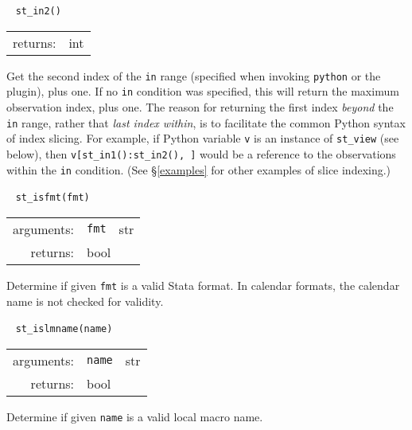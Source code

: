 \documentclass{article}
\begin{document}
			
			\ \newline
			\noindent \lstinline$st_in2()$
								
			\vspace{1.5mm}
			\noindent 
			\indent \begin{tabular}{rl}
					returns: & int
				\end{tabular}
								
			\vspace{1.5mm}
			\noindent Get the second index of the \texttt{in} range (specified when invoking \lstinline{python} or the plugin), plus one. If no \texttt{in} condition was specified, this will return the maximum observation index, plus one. The reason for returning the first index {\em beyond} the \texttt{in} range, rather that {\em last index within}, is to facilitate the common Python syntax of index slicing. For example, if Python variable \texttt{v} is an instance of \lstinline{st_view} (see below), then \lstinline$v[st_in1():st_in2(), ]$ would be a reference to the observations within the \texttt{in} condition. (See \S\ref{examples} for other examples of slice indexing.) \newline
			
			
			\ \newline
			\noindent \lstinline$st_isfmt(fmt)$
								
			\vspace{1.5mm}
			\noindent 
			\indent \begin{tabular}{rrl}
					arguments: & \texttt{fmt} & str \\
					returns: & \multicolumn{2}{l}{bool}
				\end{tabular}
								
			\vspace{1.5mm}
			\noindent Determine if given \lstinline{fmt} is a valid Stata format. In calendar formats, the calendar name is not checked for validity. \newline
			
			
			\ \newline
			\noindent \lstinline$st_islmname(name)$
								
			\vspace{1.5mm}
			\noindent 
			\indent \begin{tabular}{rrl}
					arguments: & \texttt{name} & str \\
					returns: & \multicolumn{2}{l}{bool}
				\end{tabular}
								
			\vspace{1.5mm}
			\noindent Determine if given \lstinline{name} is a valid local macro name. \newline
			
\end{document}
